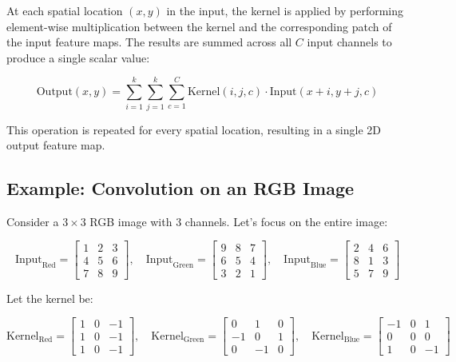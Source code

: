 \begin{notechapter}
At each spatial location \((x, y)\) in the input, the kernel is 
applied by performing element-wise multiplication between the kernel 
and the corresponding patch of the input feature maps. The results 
are summed across all \(C\) input channels to produce a single scalar 
value:

\[
\text{Output}(x, y) = \sum_{i=1}^{k} \sum_{j=1}^{k} \sum_{c=1}^{C} 
\text{Kernel}(i, j, c) \cdot \text{Input}(x+i, y+j, c)
\]

This operation is repeated for every spatial location, resulting in 
a single 2D output feature map.

\subsection{Example: Convolution on an RGB Image}

Consider a \(3 \times 3\) RGB image with 3 channels. Let's focus on 
the entire image:

\[
\text{Input}_{\text{Red}} = \begin{bmatrix}
1 & 2 & 3 \\
4 & 5 & 6 \\
7 & 8 & 9
\end{bmatrix}, \quad
\text{Input}_{\text{Green}} = \begin{bmatrix}
9 & 8 & 7 \\
6 & 5 & 4 \\
3 & 2 & 1
\end{bmatrix}, \quad
\text{Input}_{\text{Blue}} = \begin{bmatrix}
2 & 4 & 6 \\
8 & 1 & 3 \\
5 & 7 & 9
\end{bmatrix}
\]

Let the kernel be:

\[
\text{Kernel}_{\text{Red}} = \begin{bmatrix}
1 & 0 & -1 \\
1 & 0 & -1 \\
1 & 0 & -1
\end{bmatrix}, \quad
\text{Kernel}_{\text{Green}} = \begin{bmatrix}
0 & 1 & 0 \\
-1 & 0 & 1 \\
0 & -1 & 0
\end{bmatrix}, \quad
\text{Kernel}_{\text{Blue}} = \begin{bmatrix}
-1 & 0 & 1 \\
0 & 0 & 0 \\
1 & 0 & -1
\end{bmatrix}
\]


\end{notechapter}
